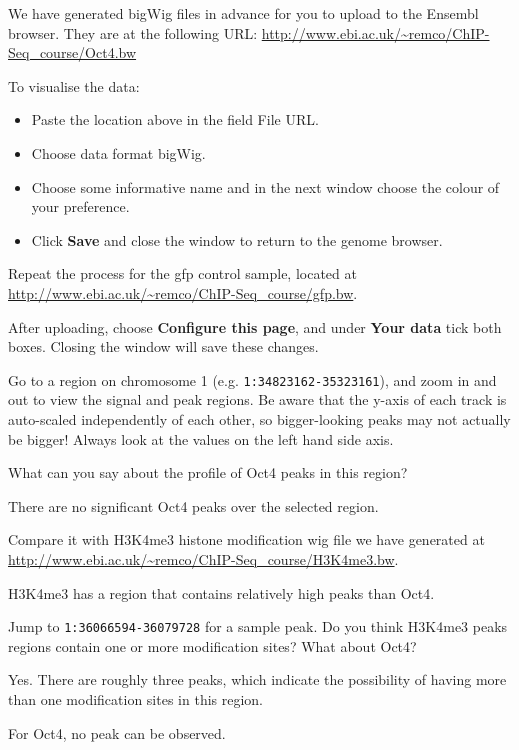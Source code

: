 \begin{steps}
We have generated bigWig files in advance for you to upload to the Ensembl
browser. They are at the following URL:
\url{http://www.ebi.ac.uk/~remco/ChIP-Seq_course/Oct4.bw}

To visualise the data:
\begin{itemize}
	\item Paste the location above in the field File URL. 
	\item Choose data format bigWig. 
	\item Choose some informative name and in the next window choose the colour of your preference. 
	\item Click \textbf{Save} and close the window to return to the genome browser. 
\end{itemize}
Repeat the process for the gfp control sample, located at
\url{http://www.ebi.ac.uk/~remco/ChIP-Seq_course/gfp.bw}.
 
After uploading, choose \textbf{Configure this page}, and under \textbf{Your
data} tick both boxes. Closing the window will save these changes.

Go to a region on chromosome 1 (e.g. \texttt{1:34823162-35323161}), and zoom in and out
to view the signal and peak regions. Be aware that the y-axis of each track is auto-scaled independently of each other,
so bigger-looking peaks may not actually be bigger! Always look at the values
on the left hand side axis.
\end{steps}

\begin{questions}
What can you say about the profile of Oct4 peaks in this region? 
\begin{answer}
There are no significant Oct4 peaks over the selected region.
\end{answer}

Compare it with H3K4me3 histone modification wig file we have generated at 
\url{http://www.ebi.ac.uk/~remco/ChIP-Seq_course/H3K4me3.bw}. 
\begin{answer}
H3K4me3 has a region that contains relatively high peaks than Oct4. 
\end{answer}

Jump to \texttt{1:36066594-36079728} for a sample peak. Do you think H3K4me3
peaks regions contain one or more modification sites? What about Oct4?
\begin{answer}
Yes. There are roughly three peaks, which indicate the possibility of having more than one modification sites in this region. 

For Oct4, no peak can be observed.
\end{answer}

\end{questions}

